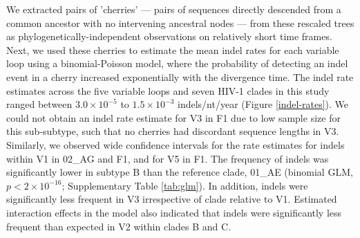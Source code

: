 \documentclass[12pt]{article}
\begin{document}
We extracted pairs of 'cherries' --- pairs of sequences directly descended from a common ancestor with no intervening ancestral nodes --- from these rescaled trees as phylo\-genetically-independent observations on relatively short time frames.
Next, we used these cherries to estimate the mean indel rates for each variable loop using a binomial-Poisson model, where the probability of detecting an indel event in a cherry increased exponentially with the divergence time.
The indel rate estimates across the five variable loops and seven HIV-1 clades in this study ranged between $3.0 \times10^{-5}$ to $1.5\times10^{-3}$ indels/nt/year (Figure \ref{indel-rates}). 
We could not obtain an indel rate estimate for V3 in F1 due to low sample size for this sub-subtype, such that no cherries had discordant sequence lengths in V3.
Similarly, we observed wide confidence intervals for the rate estimates for indels within V1 in 02\_AG and F1, and for V5 in F1.  
The frequency of indels was significantly lower in subtype B than the reference clade, 01\_AE (binomial GLM, $p<2\times 10^{-16}$; Supplementary Table \ref{tab:glm}).
In addition, indels were significantly less frequent in V3 irrespective of clade relative to V1.
Estimated interaction effects in the model also indicated that indels were significantly less frequent than expected in V2 within clades B and C.
\end{document}
